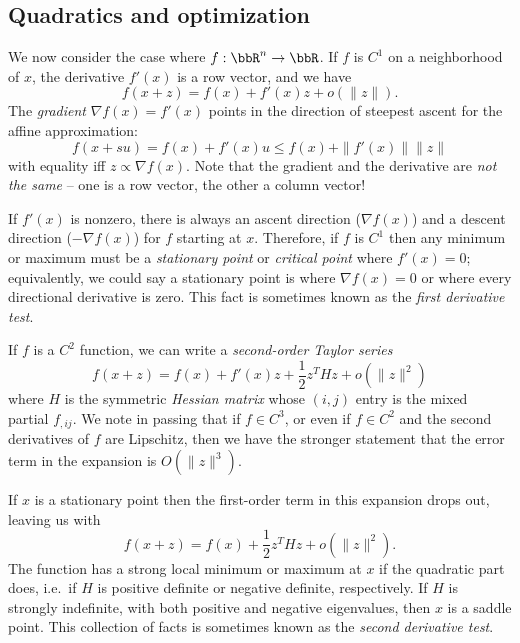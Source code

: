 \documentclass[12pt, leqno]{article} %
\begin{document}
\subsection*{Quadratics and optimization}

We now consider the case where $f : \bbR^n \rightarrow \bbR$.
If $f$ is $C^1$ on a neighborhood of $x$, the derivative $f'(x)$
is a row vector, and we have
\[
  f(x+z) = f(x) + f'(x) z + o(\|z\|).
\]
The {\em gradient} $\nabla f(x) = f'(x)$ points in the direction
of steepest ascent for the affine approximation:
\[
  f(x+su) = f(x) + f'(x) u \leq f(x) + \|f'(x)\| \|z\|
\]
with equality iff $z \propto \nabla f(x)$.  Note that the gradient
and the derivative are {\em not the same} -- one is a row vector,
the other a column vector!

If $f'(x)$ is nonzero, there is always an ascent direction ($\nabla
f(x)$) and a descent direction ($-\nabla f(x)$) for $f$ starting at
$x$.  Therefore, if $f$ is $C^1$ then any minimum or maximum must be a
{\em stationary point} or {\em critical point} where $f'(x) = 0$;
equivalently, we could say a stationary point is where
$\nabla f(x) = 0$ or where every directional derivative is zero.
This fact is sometimes known as the {\em first derivative test}.

If $f$ is a $C^2$ function, we can write a {\em second-order Taylor series}
\[
  f(x+z) = f(x) + f'(x) z + \frac{1}{2} z^T H z + o(\|z\|^2)
\]
where $H$ is the symmetric {\em Hessian matrix} whose $(i,j)$ entry is
the mixed partial $f_{,ij}$.  We note in passing that if $f \in C^3$,
or even if $f \in C^2$ and the second derivatives of $f$ are
Lipschitz, then we have the stronger statement that the error term in
the expansion is $O(\|z\|^3)$.

If $x$ is a stationary point then the first-order term in this
expansion drops out, leaving us with
\[
  f(x+z) = f(x) + \frac{1}{2} z^T H z + o(\|z\|^2).
\]
The function has a strong local minimum or maximum at $x$ if
the quadratic part does, i.e.~if $H$ is positive definite or
negative definite, respectively.  If $H$ is strongly indefinite,
with both positive and negative eigenvalues, then $x$ is a saddle
point.  This collection of facts is sometimes known as the
{\em second derivative test}.
\end{document}
